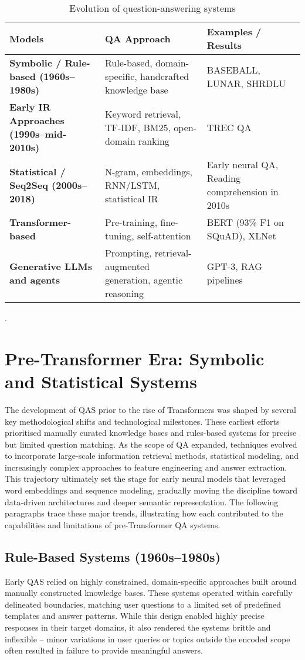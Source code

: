 \begin{spacing}{1.5}
\addtocounter{table}{-1}
\begin{table}[H]
\centering
\begin{tabularx}{\textwidth}{>{\raggedright\arraybackslash\bfseries}X >{\raggedright\arraybackslash}X >{\raggedright\arraybackslash}X}
\toprule
\textbf{Models} & \textbf{QA Approach} & \textbf{Examples / Results}\\
\midrule
Symbolic / Rule-based (1960s–1980s) & Rule-based, domain-specific, handcrafted knowledge base & BASEBALL, LUNAR, SHRDLU \\
Early IR Approaches (1990s–mid-2010s) & Keyword retrieval, TF-IDF, BM25, open-domain ranking & TREC QA \\
Statistical / Seq2Seq (2000s–2018) & N-gram, embeddings, RNN/LSTM, statistical IR & Early neural QA, Reading comprehension in 2010s \\
Transformer-based & Pre-training, fine-tuning, self-attention & BERT (93\% F1 on SQuAD), XLNet \\
Generative LLMs and agents & Prompting, retrieval-augmented generation, agentic reasoning & GPT-3, RAG pipelines \\
\bottomrule
\end{tabularx}
\vspace{0.5em}
\caption{Evolution of question-answering systems}.
\label{tab:qa_evolution}
\end{table}

\section{Pre-Transformer Era: Symbolic and Statistical Systems}
The development of QAS prior to the rise of Transformers was shaped by several key methodological shifts and technological milestones. These earliest efforts prioritised manually curated knowledge bases and rules-based systems for precise but limited question matching. As the scope of QA expanded, techniques evolved to incorporate large-scale information retrieval methods, statistical modeling, and increasingly complex approaches to feature engineering and answer extraction. This trajectory ultimately set the stage for early neural models that leveraged word embeddings and sequence modeling, gradually moving the discipline toward data-driven architectures and deeper semantic representation. The following paragraphs trace these major trends, illustrating how each contributed to the capabilities and limitations of pre-Transformer QA systems.

\subsection{Rule-Based Systems (1960s--1980s)}
Early QAS relied on highly constrained, domain-specific approaches built around manually constructed knowledge bases. These systems operated within carefully delineated boundaries, matching user questions to a limited set of predefined templates and answer patterns. While this design enabled highly precise responses in their target domains, it also rendered the systems brittle and inflexible -- minor variations in user queries or topics outside the encoded scope often resulted in failure to provide meaningful answers.


\end{spacing}
